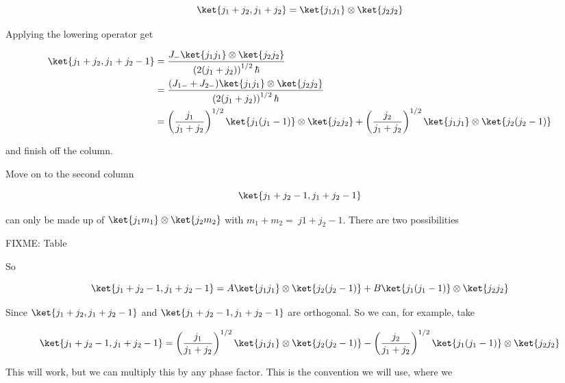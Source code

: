 \begin{equation}\label{eqn:qmTwoL18:n}
\ket{j_1 + j_2, j_1 + j_2} = \ket{j_1 j_1} \otimes \ket{j_2 j_2}
\end{equation}

Applying the lowering operator get

\begin{align*}
\ket{j_1 + j_2, j_1 + j_2 -1} 
&= 
\frac{J_{-} \ket{j_1 j_1} \otimes \ket{j_2 j_2}}{
\left(2 (j_1+ j_2)\right)^{1/2} \hbar
} \\
&=
\frac{(J_{1-} + J_{2-}) \ket{j_1 j_1} \otimes \ket{j_2 j_2}}{
\left(2 (j_1+ j_2)\right)^{1/2} \hbar
} \\
&=
\left(\frac{j_1}{j_1 + j_2}\right)^{1/2}
\ket{j_1 (j_1-1)} \otimes \ket{j_2 j_2}
+
\left(\frac{j_2}{j_1 + j_2}\right)^{1/2}
\ket{j_1 j_1} \otimes \ket{j_2 (j_2-1)}
 \\
\end{align*}

and finish off the column.

Move on to the second column

\begin{equation}\label{eqn:qmTwoL18:n}
\ket{j_1 + j_2 - 1, j_1 + j_2 -1} 
\end{equation}

can only be made up of $\ket{j_1 m_1} \otimes \ket{j_2 m_2}$ with $m_1 + m_2 = \
j1 + j_2 -1$.  There are two possibilities

FIXME: Table

So

\begin{equation}\label{eqn:qmTwoL18:n}
\ket{j_1 + j_2 - 1, j_1 + j_2 -1} 
=
A
\ket{j_1 j_1} \otimes \ket{j_2 (j_2-1)}
+
B
\ket{j_1 (j_1-1)} \otimes \ket{j_2 j_2}
\end{equation}

Since $\ket{j_1 + j_2, j_1 + j_2 -1}$ and $\ket{j_1 + j_2 - 1, j_1 + j_2 -1}$ are orthogonal.  So we can, for example, take

\begin{equation}\label{eqn:qmTwoL18:n}
\ket{j_1 + j_2 - 1, j_1 + j_2 -1} 
=
\left(\frac{j_1}{j_1 + j_2}\right)^{1/2}
\ket{j_1 j_1} \otimes \ket{j_2 (j_2-1)}
-
\left(\frac{j_2}{j_1 + j_2}\right)^{1/2}
\ket{j_1 (j_1-1)} \otimes \ket{j_2 j_2}
\end{equation}

This will work, but we can multiply this by any phase factor.  This is the convention we will use, where we

